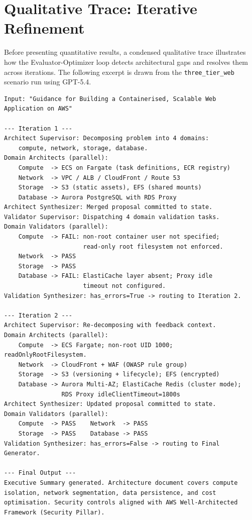 \section{Qualitative Trace: Iterative Refinement}

Before presenting quantitative results, a condensed qualitative trace illustrates how the Evaluator-Optimizer loop detects architectural gaps and resolves them across iterations. The following excerpt is drawn from the \texttt{three\_tier\_web} scenario run using GPT-5.4.

\begin{verbatim}
Input: "Guidance for Building a Containerised, Scalable Web Application on AWS"

--- Iteration 1 ---
Architect Supervisor: Decomposing problem into 4 domains:
    compute, network, storage, database.
Domain Architects (parallel):
    Compute  -> ECS on Fargate (task definitions, ECR registry)
    Network  -> VPC / ALB / CloudFront / Route 53
    Storage  -> S3 (static assets), EFS (shared mounts)
    Database -> Aurora PostgreSQL with RDS Proxy
Architect Synthesizer: Merged proposal committed to state.
Validator Supervisor: Dispatching 4 domain validation tasks.
Domain Validators (parallel):
    Compute  -> FAIL: non-root container user not specified;
                      read-only root filesystem not enforced.
    Network  -> PASS
    Storage  -> PASS
    Database -> FAIL: ElastiCache layer absent; Proxy idle
                      timeout not configured.
Validation Synthesizer: has_errors=True -> routing to Iteration 2.

--- Iteration 2 ---
Architect Supervisor: Re-decomposing with feedback context.
Domain Architects (parallel):
    Compute  -> ECS Fargate; non-root UID 1000; readOnlyRootFilesystem.
    Network  -> CloudFront + WAF (OWASP rule group)
    Storage  -> S3 (versioning + lifecycle); EFS (encrypted)
    Database -> Aurora Multi-AZ; ElastiCache Redis (cluster mode);
                RDS Proxy idleClientTimeout=1800s
Architect Synthesizer: Updated proposal committed to state.
Domain Validators (parallel):
    Compute  -> PASS    Network  -> PASS
    Storage  -> PASS    Database -> PASS
Validation Synthesizer: has_errors=False -> routing to Final Generator.

--- Final Output ---
Executive Summary generated. Architecture document covers compute
isolation, network segmentation, data persistence, and cost
optimisation. Security controls aligned with AWS Well-Architected
Framework (Security Pillar).
\end{verbatim}

